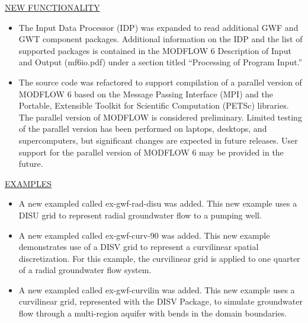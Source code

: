 	
	\item \currentmodflowversion

	\underline{NEW FUNCTIONALITY}
	\begin{itemize}
		\item The Input Data Processor (IDP) was expanded to read additional GWF and GWT component packages.  Additional information on the IDP and the list of supported packages is contained in the MODFLOW 6 Description of Input and Output (mf6io.pdf) under a section titled ``Processing of Program Input.''
		\item The source code was refactored to support compilation of a parallel version of MODFLOW 6 based on the Message Passing Interface (MPI) and the Portable, Extensible Toolkit for Scientific Computation (PETSc) libraries.  The parallel version of MODFLOW is considered preliminary. Limited testing of the parallel version has been performed on laptops, desktops, and supercomputers, but significant changes are expected in future releases. User support for the parallel version of MODFLOW 6 may be provided in the future.
	\end{itemize}

	\underline{EXAMPLES}
	\begin{itemize}
		\item A new exampled called ex-gwf-rad-disu was added.  This new example uses a DISU grid to represent radial groundwater flow to a pumping well.
		\item A new exampled called ex-gwf-curv-90 was added.  This new example demonstrates use of a DISV grid to represent a curvilinear spatial discretization.  For this example, the curvilinear grid is applied to one quarter of a radial groundwater flow system.
		\item A new exampled called ex-gwf-curvilin was added.  This new example uses a curvilinear grid, represented with the DISV Package, to simulate groundwater flow through a multi-region aquifer with bends in the domain boundaries.
	\end{itemize}

